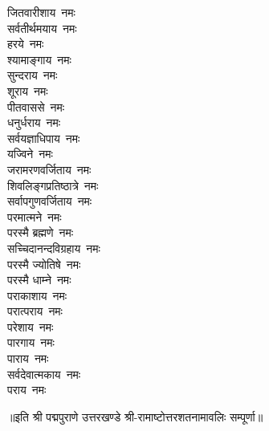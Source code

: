 \begin{multicols}{2}
\begin{flushleft}
जितवारीशाय~नमः\\
सर्वतीर्थमयाय~नमः\\
हरये~नमः\\
श्यामाङ्गाय~नमः\\
सुन्दराय~नमः\\
शूराय~नमः\\
पीतवाससे~नमः\hfill{}\\
धनुर्धराय~नमः\\
सर्वयज्ञाधिपाय~नमः\\
यज्विने~नमः\\
जरामरणवर्जिताय~नमः\\
शिवलिङ्गप्रतिष्ठात्रे~नमः\\
सर्वापगुणवर्जिताय~नमः\\
परमात्मने~नमः\\
परस्मै ब्रह्मणे~नमः\\
सच्चिदानन्दविग्रहाय~नमः\\
परस्मै ज्योतिषे~नमः\hfill{}\\
परस्मै धाम्ने~नमः\\
पराकाशाय~नमः\\
परात्पराय~नमः\\
परेशाय~नमः\\
पारगाय~नमः\\
पाराय~नमः\\
सर्वदेवात्मकाय~नमः\\
पराय~नमः\\
\end{flushleft}
\end{multicols}
॥इति श्री पद्मपुराणे उत्तरखण्डे श्री-रामाष्टोत्तरशतनामावलिः सम्पूर्णा॥
